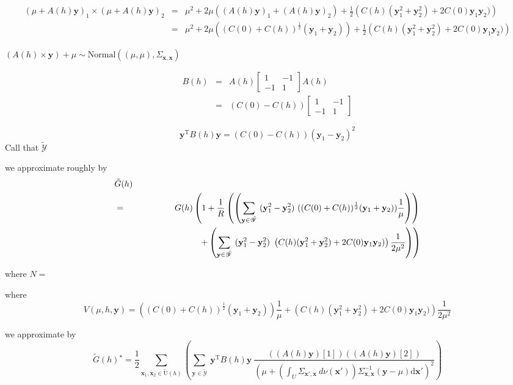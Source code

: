 \documentclass[12pt]{article}
\theoremstyle{definition}
\theoremstyle{remark}
\newcommand{\range}[1]{\mathscr{#1}}
\newcommand{\dominantU}{\nu}
\newcommand{\derive}{\mathrm{d}}
\newcommand{\Semivariogram}{G}
\newcommand{\Pop}{\mathrm{U}}
\newcommand{\position}{\mathbf{x}}
\newcommand{\Signal}{Y}
\newcommand{\signal}{\mathbf{y}}
\begin{document}
\begin{eqnarray*}
(\mu+A(h)\signal)_1\times (\mu+A(h)\signal)_2&=&
\mu^2+
2\mu((A(h)\signal)_1+(A(h)\signal)_2)+\frac12 \left(C(h)(\signal_1^2+\signal_2^2)+2C(0)\signal_1\signal_2)\right)\\&=&
\mu^2+
2\mu((C(0)+C(h))^{\frac12}(\signal_1+\signal_2))+\frac12 \left(C(h)(\signal_1^2+\signal_2^2)+2C(0)\signal_1\signal_2)\right)
\end{eqnarray*}



$(A(h)\times\signal)+\mu\sim\mathrm{Normal}((\mu,\mu),\Sigma_{\position,\position})$

\begin{eqnarray*}
    B(h)&=&A(h)\begin{bmatrix}1&-1\\-1&1\end{bmatrix}A(h)\\
        &=&(C(0)-C(h))\begin{bmatrix}1&-1\\-1&1\end{bmatrix}
\end{eqnarray*}


$$\signal^{\mathrm{T}} B(h)\signal=(C(0)-C(h))(\signal_1-\signal_2)^2$$
Call that $\tilde{\mathscr{Y}}$

we approximate roughly by 
\begin{eqnarray*}
\lefteqn{\tilde\Semivariogram(h)}\\&=&
\Semivariogram(h)\left(1+ \frac1{R} \left(\left(\sum_{\signal\in\tilde{\range{\Signal}}} ~(\signal_1^2-\signal_2^2)~ 
((C(0)+C(h))^{\frac12}(\signal_1+\signal_2))\frac1\mu
\right)\right)\right.\\&&\quad\quad\quad\quad\quad\quad\quad\quad\left.
+\left(\sum_{\signal\in\tilde{\range{\Signal}}} ~(\signal_1^2-\signal_2^2)~ \left(C(h)(\signal_1^2+\signal_2^2)+2C(0)\signal_1\signal_2)\right)\frac1{2\mu^2}
\right)\right)\end{eqnarray*}

where $N=$

where $$V(\mu,h,\signal)=
((C(0)+C(h))^{\frac12}(\signal_1+\signal_2))\frac1\mu+ \left(C(h)(\signal_1^2+\signal_2^2)+2C(0)\signal_1\signal_2)\right)\frac1{2\mu^2}
 $$

we approximate by 
$$\tilde\Semivariogram(h)^\star=\frac12\sum_{\position_1,\position_2\in\tilde{\Pop}(h)} \left(\sum_{\signal\in\tilde{\range{\Signal}}} ~\signal^{\mathrm{T}} B(h)\signal~ 
  \frac{
  ((A(h)\signal)[1])
  ((A(h)\signal)[2])
  }{\left(
           \mu+\left(\int_{U}\Sigma_{\position',\position}~d\dominantU\left(\position'\right)\right)\Sigma_{\position,\position}^{-1}(\signal-\mu)\derive\position'\right)^{2} }
\right) $$
\end{document}
